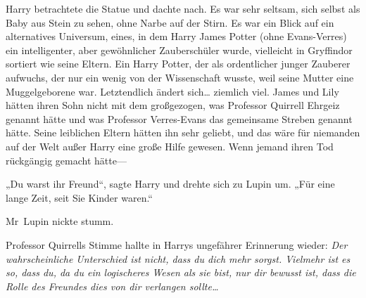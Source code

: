 Harry betrachtete die Statue und dachte nach. Es war sehr seltsam, sich selbst als Baby aus Stein zu sehen, ohne Narbe auf der Stirn. Es war ein Blick auf ein alternatives Universum, eines, in dem Harry James Potter (ohne Evans-Verres) ein intelligenter, aber gewöhnlicher Zauberschüler wurde, vielleicht in Gryffindor sortiert wie seine Eltern. Ein Harry Potter, der als ordentlicher junger Zauberer aufwuchs, der nur ein wenig von der Wissenschaft wusste, weil seine Mutter eine Muggelgeborene war. Letztendlich ändert sich… ziemlich viel. James und Lily hätten ihren Sohn nicht mit dem großgezogen, was Professor Quirrell Ehrgeiz genannt hätte und was Professor Verres-Evans das gemeinsame Streben genannt hätte. Seine leiblichen Eltern hätten ihn sehr geliebt, und das wäre für niemanden auf der Welt außer Harry eine große Hilfe gewesen. Wenn jemand ihren Tod rückgängig gemacht hätte—

„Du warst ihr Freund“, sagte Harry und drehte sich zu Lupin um.
„Für eine lange Zeit, seit Sie Kinder waren.“

Mr~Lupin nickte stumm.

Professor Quirrells Stimme hallte in Harrys ungefährer Erinnerung wieder: \emph{Der wahrscheinliche Unterschied ist nicht, dass du dich mehr sorgst. Vielmehr ist es so, dass du, da du ein logischeres Wesen als sie bist, nur dir bewusst ist, dass die Rolle des Freundes dies von dir verlangen sollte…}

